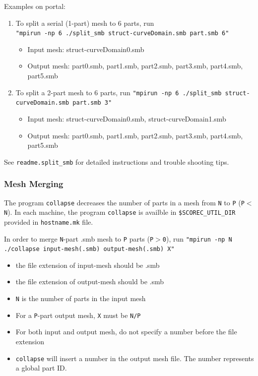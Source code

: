 Examples on portal:
\begin{enumerate}
\item To split a serial (1-part) mesh to 6 parts, run\\
 \texttt{"mpirun -np 6 ./split\_smb struct-curveDomain.smb part.smb 6"}
\begin{itemize}
\item	Input mesh: struct-curveDomain0.smb 
\item	Output mesh: part0.smb, part1.smb, part2.smb, part3.smb, part4.smb, part5.smb
\end{itemize}

\item To split a 2-part mesh to 6 parts, run
 \texttt{"mpirun -np 6 ./split\_smb  struct-curveDomain.smb part.smb 3"}
\begin{itemize}
\item	Input mesh: struct-curveDomain0.smb, struct-curveDomain1.smb
\item	Output mesh: part0.smb, part1.smb, part2.smb, part3.smb, part4.smb, part5.smb
\end{itemize}
\end{enumerate}

See \texttt{readme.split\_smb} for detailed instructions and trouble shooting tips.

\subsubsection{Mesh Merging}
\label{ch:mesh-mg}

The program \texttt{collapse} decreases the number of parts in a mesh from \texttt{N} to \texttt{P} (\texttt{P$<$N}). 
In each machine, the program \texttt{collapse} is availble in \texttt{\$SCOREC\_UTIL\_DIR} provided in \texttt{hostname.mk} file.

In order to merge \texttt{N}-part .smb mesh to \texttt{P} parts (\texttt{P$>$0}), run
\texttt{"mpirun -np N ./collapse input-mesh(.smb) output-mesh(.smb) X"}
\begin{itemize}
\item	the file extension of input-mesh should be .smb 
\item	the file extension of output-mesh should be .smb
\item	\texttt{N} is the number of parts in the input mesh
\item	For a \texttt{P}-part output mesh, \texttt{X} must be \texttt{N/P}
\item	For both input and output mesh, do not specify a number before the file extension
\item	\texttt{collapse} will insert a number in the output mesh file. The number represents a global part ID.
\end{itemize}

